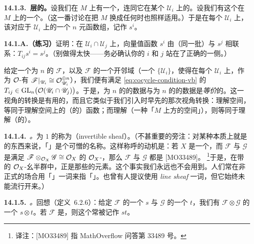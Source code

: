 \textbf{14.1.3.\ \trSection{}层的\trTransitionFunction。}\quad 设我们在 $M$ 上有一个\trVectorBundle，连同它在某个\trOpenCover{} $\mathscr{U}_i$ 上的\trTrivialization。设我们有这个\trVectorBundle{}在 $M$ 上的一个\trSection。（这一番讨论在把 $M$ 换成任何\trOpenSubset{}时也照样适用。）于是在每个 $\mathscr{U}_i$ 上，该\trSection{}对应于 $\mathscr{U}_i$ 上的一个 $n$ 元函数组，记作 $s^i$。

\textbf{14.1.A.（练习）}\quad 证明：在 $\mathscr{U}_i\cap\mathscr{U}_j$ 上，向量值函数 $s^i$ 由（同一批）\trTransitionFunction{}与 $s^j$ 相联系：$T_{ij}s^i=s^j$。（别做得太快——务必确认你的 $i$ 和 $j$ 站在了正确的一侧。）

给定一个\trRank{}为 $n$ 的\trLocallyFreeSheaf{} $\mathscr{F}$，以及 $\mathscr{F}$ 的一个\trTrivialization{}开邻域（一个\trOpenCover{} $\{\mathscr{U}_i\}$，使得在每个 $\mathscr{U}_i$ 上，作为 $\mathcal{O}$-\trModule{}有 $\mathscr{F}\vert_{\mathscr{U}_i}\cong\mathcal{O}_{\mathscr{U}_i}^{\oplus n}$），我们便有满足\trCocycleCondition{} \eqref{eq:cocycle-condition-vb} 的\trTransitionFunction $T_{ij}\in\mathrm{GL}_n\bigl(\mathcal{O}(\mathscr{U}_i\cap\mathscr{U}_j)\bigr)$。于是，\trRank{}为 $n$ 的\trLocallyFreeSheaf{}的数据与\trRank{}为 $n$ 的\trVectorBundle{}的数据是\emph{等价}的。这一视角的转换是有用的，而且它类似于我们引入\trRingedSpace{}时早先的那次视角转换：理解空间，等同于理解空间上的（\trSheaf{}的）函数；而理解\trVectorBundle（一种「$M$ 上方的空间」），则等同于理解（\trSheaf{}的）\trSection。

\textbf{14.1.4.}\ \emph{\trhDefinition{}。}\quad \trRank{}为 $1$ 的\trLocallyFreeSheaf{}称为\textbf{\trInvertibleSheaf}（invertible sheaf）。（不甚重要的旁注：对某种本质上就是\trLineBundle{}的东西来说，「\trInvertibleSheaf」是个可憎的名称。这样称呼的动机是：若 $X$ 是一个\trLocallyRingedSpace，而 $\mathscr{F}$ 与 $\mathscr{G}$ 是满足 $\mathscr{F}\otimes_{\mathcal{O}_X}\mathscr{G}\cong\mathcal{O}_X$ 的 $\mathcal{O}_X$-\trModule，那么 $\mathscr{F}$ 与 $\mathscr{G}$ 都是\trInvertibleSheaf{} [MO33489]。%
\footnote{译注：[MO33489] 指 MathOverflow 问答第 33489 号。}于是，在带\trTensorProduct{}的 $\mathcal{O}_X$-\trModule{}幺半群中，\trInvertibleSheaf{}正是那些\trInvertible{}的元素。这个事实我们永远也不会用到。人们常在非正式的场合用「\trLineBundle」一词来指「\trInvertibleSheaf」。也曾有人提议使用 \emph{line sheaf} 一词，但它始终未能流行开来。）

\textbf{14.1.5.}\ \emph{\trhNotation{}。}\quad 回想（定义~6.2.6）：给定 $\mathscr{F}$ 的一个\trSection{} $s$ 与 $\mathscr{G}$ 的一个\trSection{} $t$，我们有 $\mathscr{F}\otimes\mathscr{G}$ 的一个\trSection{} $s\otimes t$。若 $\mathscr{F}$ 是\trInvertibleSheaf，则这个\trSection{}常被记作 $st$。

